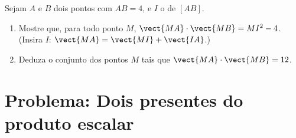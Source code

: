 \begin{exercise}[$\star\star\star$]\label{exo:g11:scal:11}
Sejam $A$ e $B$ dois pontos com $AB = 4$, e $I$ o  de $[AB]$.
\begin{enumerate}
  \item Mostre que, para todo ponto $M$,
        $\vect{MA}\cdot\vect{MB} = MI^2 - 4$. (Insira $I$:
        $\vect{MA} = \vect{MI} + \vect{IA}$.)
  \item Deduza o conjunto dos pontos $M$ tais que
        $\vect{MA}\cdot\vect{MB} = 12$.
\end{enumerate}
\end{exercise}

\section{Problema: Dois presentes do produto escalar}

